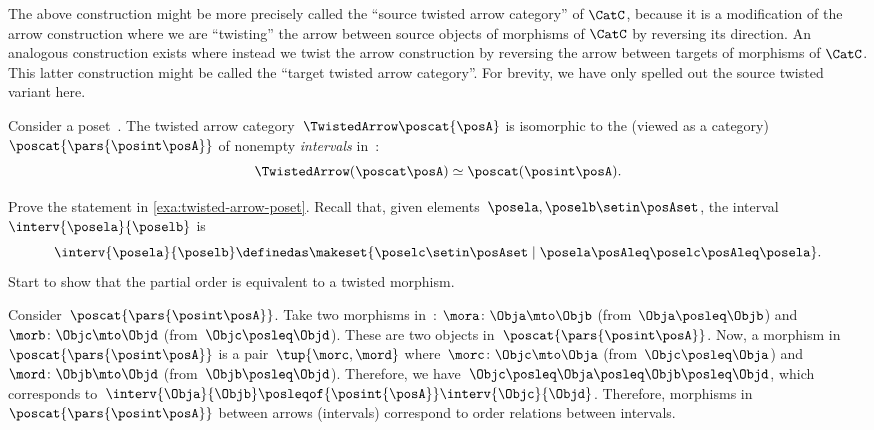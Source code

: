 \begin{remark}
The above construction might be more precisely called the ``source twisted arrow category'' of $\CatC$, because it is a modification of the arrow construction where we are ``twisting'' the arrow between source objects of morphisms of $\CatC$ by reversing its direction. An analogous construction exists where instead we twist the arrow construction by reversing the arrow between targets of morphisms of $\CatC$. This latter construction might be called the ``target twisted arrow category''. For brevity, we have only spelled out the source twisted variant here.
\end{remark}

\begin{example}
    \label{exa:twisted-arrow-poset}
    Consider a poset~\posA.
    The twisted arrow category~$\TwistedArrow \poscat{\posA}$ is isomorphic to the  (viewed as a category)~$\poscat{\pars{\posint\posA}}$ of nonempty \emph{intervals} in~\posA:
    \begin{equation}
        \TwistedArrow (\poscat \posA) \simeq \poscat (\posint\posA) .
    \end{equation}
\end{example}

\begin{exercise}
    Prove the statement in \cref{exa:twisted-arrow-poset}.
    Recall that, given elements~$\posela, \poselb \setin \posAset$, the interval~$\interv{\posela}{\poselb}$ is
    \begin{equation}
        \interv{\posela}{\poselb}
        \definedas \makeset{\poselc \setin \posAset \mid \posela\posAleq \poselc \posAleq \posela}.
    \end{equation}
    Start to show that the partial order is equivalent to a twisted morphism.
\end{exercise}
\begin{solution}
    Consider~$\poscat{\pars{\posint\posA}}$.
    Take two morphisms in~\posA: $\mora\colon \Obja \mto \Objb$ (from~$\Obja \posleq \Objb$) and $\morb\colon \Objc\mto \Objd$ (from~$\Objc \posleq \Objd$).
    These are two objects in~$\poscat{\pars{\posint\posA}}$.
    Now, a morphism in~$\poscat{\pars{\posint\posA}}$ is a pair~$\tup{\morc,\mord}$ where~$\morc\colon \Objc \mto \Obja$ (from~$\Objc\posleq \Obja$) and~$\mord\colon \Objb \mto \Objd$ (from~$\Objb\posleq \Objd$).
    Therefore, we have~$\Objc\posleq \Obja\posleq \Objb\posleq \Objd$, which corresponds to~$\interv{\Obja}{\Objb}\posleqof{\posint{\posA}}\interv{\Objc}{\Objd}$.
    Therefore, morphisms in~$\poscat{\pars{\posint\posA}}$ between arrows (intervals) correspond to order relations between intervals.
\end{solution}

